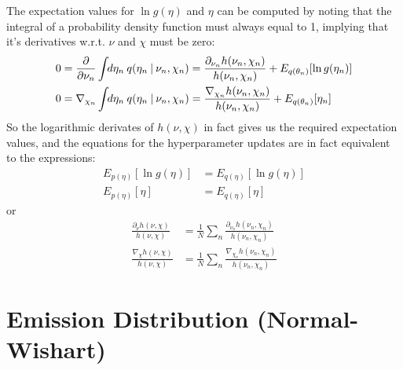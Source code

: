 The expectation values for $\ln g(\eta)$ and $\eta$ can be computed by noting that the integral of a probability density function must always equal to 1, implying that it's derivatives w.r.t. $\nu$ and $\chi$ must be zero:
\begin{align}
  0
  &=
  \frac{\partial }{\partial \nu_n}
  \int \!\!d\eta_n \:
  q(\eta_n \:|\: \nu_n, \chi_n)
  =
  \frac{\partial_{\nu_n} h(\nu_n, \chi_n)}
       {h(\nu_n, \chi_n)}
  +
  E_{q(\theta_n)} [ \ln g(\eta_n) ] 
  \\
  0
  &=
  \nabla_{\chi_n}
  \int \!\!d\eta_n \:
  q(\eta_n \:|\: \nu_n, \chi_n)
  =
  \frac{\nabla_{\chi_n} h(\nu_n, \chi_n)}
       {h(\nu_n, \chi_n)}
  +
  E_{q(\theta_n)} [\eta_n] 
\end{align}
So the logarithmic derivates of $h(\nu, \chi)$ in fact gives us the required expectation values, and the equations for the hyperparameter updates are in fact equivalent to the expressions:
\begin{align}
   E_{p(\eta)}
   \left[
     \ln g(\eta)
   \right]
   &=
   E_{q(\eta)}
   \left[
     \ln g(\eta)
   \right]
   \\
   E_{p(\eta)}
   \left[
     \eta
   \right]
   &=
   E_{q(\eta)}
   \left[
     \eta
   \right]
\end{align}
or
\begin{align}
   \frac{\partial_\nu h(\nu,\chi)}{h(\nu,\chi)}
   &=
   \frac{1}{N}
   \sum_n
   \frac{\partial_{\nu_n} h(\nu_n,\chi_n)}{h(\nu_n,\chi_n)}
   \\ 
   \frac{\nabla_\chi h(\nu,\chi)}{h(\nu,\chi)}
   &= 
   \frac{1}{N}
   \sum_n
   \frac{\nabla_{\chi_n} h(\nu_n,\chi_n)}{h(\nu_n,\chi_n)}
\end{align}

\section{Emission Distribution (Normal-Wishart)}

